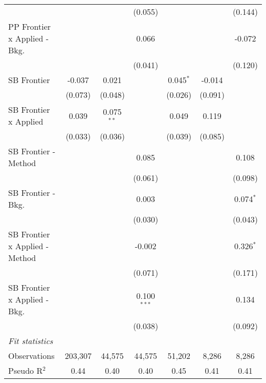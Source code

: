 \begin{tabular}{lcccccc}
                                  &              &              & (0.055)       &              &         & (0.144)\\   
   PP Frontier x Applied - Bkg.   &              &              & 0.066         &              &         & -0.072\\   
                                  &              &              & (0.041)       &              &         & (0.120)\\   
   SB Frontier                    & -0.037       & 0.021        &               & 0.045$^{*}$  & -0.014  &   \\   
                                  & (0.073)      & (0.048)      &               & (0.026)      & (0.091) &   \\   
   SB Frontier x Applied          & 0.039        & 0.075$^{**}$ &               & 0.049        & 0.119   &   \\   
                                  & (0.033)      & (0.036)      &               & (0.039)      & (0.085) &   \\   
   SB Frontier - Method           &              &              & 0.085         &              &         & 0.108\\   
                                  &              &              & (0.061)       &              &         & (0.098)\\   
   SB Frontier - Bkg.             &              &              & 0.003         &              &         & 0.074$^{*}$\\   
                                  &              &              & (0.030)       &              &         & (0.043)\\   
   SB Frontier x Applied - Method &              &              & -0.002        &              &         & 0.326$^{*}$\\   
                                  &              &              & (0.071)       &              &         & (0.171)\\   
   SB Frontier x Applied - Bkg.   &              &              & 0.100$^{***}$ &              &         & 0.134\\   
                                  &              &              & (0.038)       &              &         & (0.092)\\   
   \midrule
   \emph{Fit statistics}\\
   Observations                   & 203,307      & 44,575       & 44,575        & 51,202       & 8,286   & 8,286\\  
   Pseudo R$^2$                   & 0.44         & 0.40         & 0.40          & 0.45         & 0.41    & 0.41\\  
   

\end{tabular}
